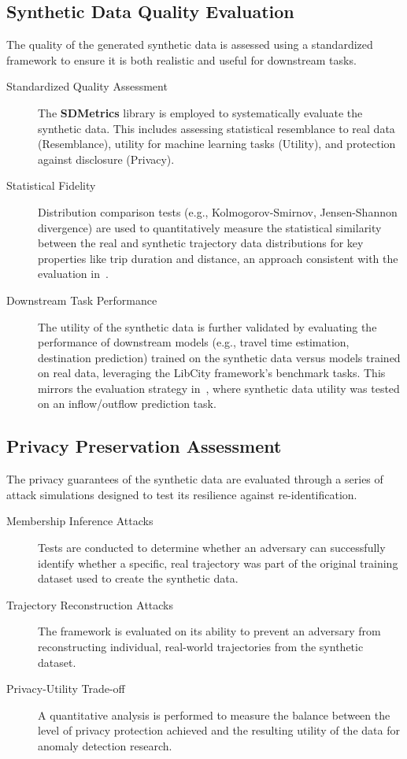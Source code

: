 \documentclass[runningheads]{llncs}
\begin{document}
\subsection{Synthetic Data Quality Evaluation}
\label{sec:synthetic-eval}

The quality of the generated synthetic data is assessed using a standardized framework to ensure it is both realistic and useful for downstream tasks.

\begin{description}
    \item[Standardized Quality Assessment] The \textbf{SDMetrics} library is employed to systematically evaluate the synthetic data. This includes assessing statistical resemblance to real data (Resemblance), utility for machine learning tasks (Utility), and protection against disclosure (Privacy).
    \item[Statistical Fidelity] Distribution comparison tests (e.g., Kolmogorov-Smirnov, Jensen-Shannon divergence) are used to quantitatively measure the statistical similarity between the real and synthetic trajectory data distributions for key properties like trip duration and distance, an approach consistent with the evaluation in~\cite{zhuDiffTrajGeneratingGPS2023}.
    \item[Downstream Task Performance] The utility of the synthetic data is further validated by evaluating the performance of downstream models (e.g., travel time estimation, destination prediction) trained on the synthetic data versus models trained on real data, leveraging the LibCity framework's benchmark tasks. This mirrors the evaluation strategy in~\cite{zhuDiffTrajGeneratingGPS2023}, where synthetic data utility was tested on an inflow/outflow prediction task.
\end{description}

\subsection{Privacy Preservation Assessment}
\label{sec:privacy-eval}

The privacy guarantees of the synthetic data are evaluated through a series of attack simulations designed to test its resilience against re-identification.

\begin{description}
    \item[Membership Inference Attacks] Tests are conducted to determine whether an adversary can successfully identify whether a specific, real trajectory was part of the original training dataset used to create the synthetic data.
    \item[Trajectory Reconstruction Attacks] The framework is evaluated on its ability to prevent an adversary from reconstructing individual, real-world trajectories from the synthetic dataset.
    \item[Privacy-Utility Trade-off] A quantitative analysis is performed to measure the balance between the level of privacy protection achieved and the resulting utility of the data for anomaly detection research.
\end{description}
\end{document}
